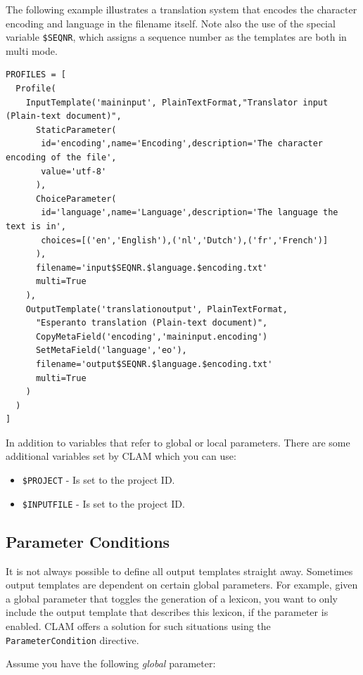 \documentclass[a4paper,12pt]{report}
\begin{document}
The following example illustrates a translation system that encodes the
character encoding and language in the filename itself. Note also the use of
the special variable \texttt{\$SEQNR}, which assigns a sequence number as the
templates are both in multi mode.

{\footnotesize{
\begin{verbatim}
PROFILES = [ 
  Profile( 
    InputTemplate('maininput', PlainTextFormat,"Translator input (Plain-text document)",  
      StaticParameter(
       id='encoding',name='Encoding',description='The character encoding of the file', 
       value='utf-8'
      ),  
      ChoiceParameter(
       id='language',name='Language',description='The language the text is in', 
       choices=[('en','English'),('nl','Dutch'),('fr','French')]
      ),
      filename='input$SEQNR.$language.$encoding.txt'
      multi=True
    ), 
    OutputTemplate('translationoutput', PlainTextFormat,
      "Esperanto translation (Plain-text document)",  
      CopyMetaField('encoding','maininput.encoding')
      SetMetaField('language','eo'),
      filename='output$SEQNR.$language.$encoding.txt'
      multi=True
    )    
  )
]
\end{verbatim}
}}

In addition to variables that refer to global or local parameters. There are some additional variables set by CLAM which you can use:

\begin{itemize}
\item \texttt{\$PROJECT} - Is set to the project ID.
\item \texttt{\$INPUTFILE} - Is set to the project ID.
\end{itemize}



\subsection{Parameter Conditions}

It is not always possible to define all output templates straight away.
Sometimes output templates are dependent on certain global parameters. For
example, given a global parameter that toggles the generation of a lexicon, you
want to only include the output template that describes this lexicon, if the
parameter is enabled. CLAM offers a solution for such situations using the
\texttt{ParameterCondition} directive.

Assume you have the following \emph{global} parameter:
\end{document}
